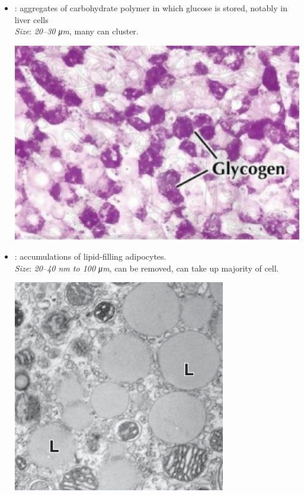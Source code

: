 \begin{multicols}{2}
\begin{itemize}
\begin{center}
  \end{center}
  \item {}: aggregates of carbohydrate polymer in which glucose is stored, notably in liver cells\\
  \textit{Size}: \emph{20--30 \si{\micro m}}, many can cluster.
  \begin{center}
    \hspace{-30pt}\includegraphics[width=0.8\columnwidth]{images/week-1-glycogen.png}
  \end{center}
  \item {}: accumulations of lipid-filling adipocytes. \\
  \textit{Size}: \emph{20--40 \si{nm} to 100 \si{\micro m}}, can be removed, can take up majority of cell.
  \begin{center}
    \hspace{-30pt}\includegraphics[width=0.7\columnwidth]{images/week-1-liquid.png}
  \end{center}
  \end{itemize}
\end{multicols}
